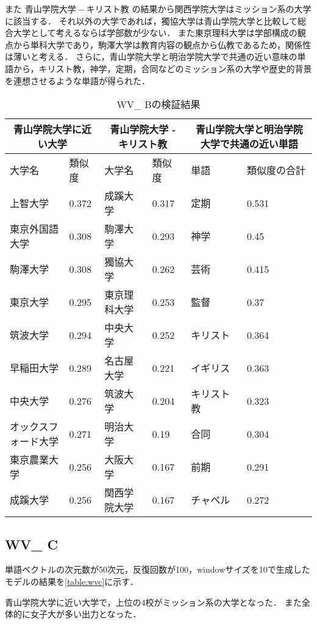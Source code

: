 また $ 青山学院大学 - キリスト教 $ の結果から関西学院大学はミッション系の大学に該当する．
それ以外の大学であれば，獨協大学は青山学院大学と比較して総合大学として考えるならば学部数が少ない．
また東京理科大学は学部構成の観点から単科大学であり，駒澤大学は教育内容の観点から仏教であるため，関係性は薄いと考える．
さらに，青山学院大学と明治学院大学で共通の近い意味の単語から，キリスト教，神学，定期，合同などのミッション系の大学や歴史的背景を連想させるような単語が得られた．

\begin{table}[H]
\caption{WV\_ Bの検証結果}
\centering
\footnotesize
\begin{tabular}{ll|ll|ll}
\hline
\multicolumn{2}{c}{青山学院大学に近い大学} & \multicolumn{2}{c}{青山学院大学 - キリスト教} & \multicolumn{2}{c}{青山学院大学と明治学院大学で共通の近い単語}
\\ \hline
大学名 & 類似度 & 大学名 & 類似度 & 単語 & 類似度の合計
\\ \hline \hline
上智大学 & 0.372 & 成蹊大学 & 0.317 & 定期 & 0.531\\
東京外国語大学 & 0.308 & 駒澤大学 & 0.293 & 神学 & 0.45\\
駒澤大学 & 0.308 & 獨協大学 & 0.262 & 芸術 & 0.415\\
東京大学 & 0.295 & 東京理科大学 & 0.253 & 監督 & 0.37\\
筑波大学 & 0.294 & 中央大学 & 0.252 & キリスト & 0.364\\
早稲田大学 & 0.289 & 名古屋大学 & 0.221 & イギリス & 0.363\\
中央大学 & 0.276 & 筑波大学 & 0.204 & キリスト教 & 0.323\\
オックスフォード大学 & 0.271 & 明治大学 & 0.19 & 合同 & 0.304\\
東京農業大学 & 0.256 & 大阪大学 & 0.167 & 前期 & 0.291\\
成蹊大学 & 0.256 & 関西学院大学 & 0.167 & チャペル & 0.272\\ \hline
\end{tabular}
\label{table:wvb}
\end{table}


\subsection{WV\_ C}
単語ベクトルの次元数が50次元，反復回数が100，windowサイズを10で生成したモデルの結果を\ref{table:wvc}に示す．

青山学院大学に近い大学で，上位の4校がミッション系の大学となった．
また全体的に女子大が多い出力となった．

